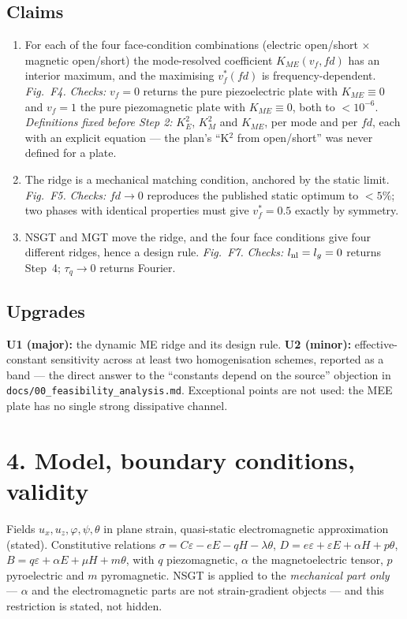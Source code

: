 \documentclass[11pt]{article}
\begin{document}
\subsection*{Claims}
\begin{enumerate}\small
\item[\textbf{C1}] For each of the four face-condition combinations (electric open/short $\times$
  magnetic open/short) the mode-resolved coefficient $K_{ME}(v_f,fd)$ has an interior maximum, and
  the maximising $v_f^{*}(fd)$ is frequency-dependent. \emph{Fig.\ F4.}
  \emph{Checks:} $v_f=0$ returns the pure piezoelectric plate with $K_{ME}\equiv0$ and $v_f=1$ the
  pure piezomagnetic plate with $K_{ME}\equiv0$, both to $<10^{-6}$.
  \emph{Definitions fixed before Step 2:} $K_E^2$, $K_M^2$ and $K_{ME}$, per mode and per $fd$,
  each with an explicit equation --- the plan's ``K$^2$ from open/short'' was never defined for a
  plate.
\item[\textbf{C2}] The ridge is a mechanical matching condition, anchored by the static limit.
  \emph{Fig.\ F5.} \emph{Checks:} $fd\to0$ reproduces the published static optimum to $<5\%$; two
  phases with identical properties must give $v_f^{*}=0.5$ exactly by symmetry.
\item[\textbf{C3}] NSGT and MGT move the ridge, and the four face conditions give four different
  ridges, hence a design rule. \emph{Fig.\ F7.} \emph{Checks:} $l_{\rm nl}=l_g=0$ returns Step~4;
  $\tau_q\to0$ returns Fourier.
\end{enumerate}

\subsection*{Upgrades}
\textbf{U1 (major):} the dynamic ME ridge and its design rule. \textbf{U2 (minor):} effective-constant
sensitivity across at least two homogenisation schemes, reported as a band --- the direct answer to
the ``constants depend on the source'' objection in \texttt{docs/00\_feasibility\_analysis.md}.
Exceptional points are not used: the MEE plate has no single strong dissipative channel.

\section*{4. Model, boundary conditions, validity}
Fields $u_x,u_z,\varphi,\psi,\theta$ in plane strain, quasi-static electromagnetic approximation
(stated). Constitutive relations
$\sigma=C\varepsilon-eE-qH-\lambda\theta$, $D=e\varepsilon+\varepsilon E+\alpha H+p\theta$,
$B=q\varepsilon+\alpha E+\mu H+m\theta$, with $q$ piezomagnetic, $\alpha$ the magnetoelectric tensor,
$p$ pyroelectric and $m$ pyromagnetic. NSGT is applied to the \emph{mechanical part only} ---
$\alpha$ and the electromagnetic parts are not strain-gradient objects --- and this restriction is
stated, not hidden.
\end{document}
